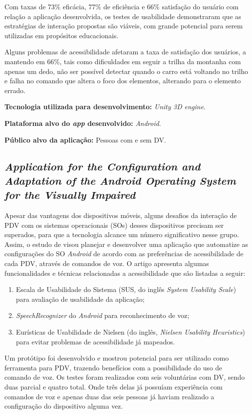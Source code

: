 Com taxas de 73\% eficácia, 77\% de eficiência e 66\% satisfação do usuário com relação a aplicação desenvolvida, os testes de usabilidade demonstraram que as estratégias de interação propostas são viáveis, com grande potencial para serem utilizadas em propósitos educacionais.

Alguns problemas de acessibilidade afetaram a taxa de satisfação dos usuários, a mantendo em 66\%, tais como dificuldades em seguir a trilha da montanha com apenas um dedo, não ser possível detectar quando o carro está voltando no trilho e falha no comando que altera o foco dos elementos, alterando para o elemento errado.

\textbf{Tecnologia utilizada para desenvolvimento:} \emph{Unity 3D engine}.

\textbf{Plataforma alvo do \emph{app} desenvolvido:} \emph{Android}.

\textbf{Público alvo da aplicação:} Pessoas com e sem DV\@.

\subsection{\emph{Application for the Configuration and Adaptation of the Android Operating System for the Visually Impaired}}

Apesar das vantagens dos dispositivos móveis, alguns desafios da interação de PDV com os sistemas operacionais (SOs) desses dispositivos precisam ser superados, para que a tecnologia alcance um número significativo nesse grupo.
Assim, o estudo de  visou planejar e desenvolver uma aplicação que automatize as configurações do SO \emph{Android} de acordo com as preferências de acessibilidade de cada PDV, através de comandos de voz.
O artigo apresenta algumas funcionalidades e técnicas relacionadas a acessibilidade que são listadas a seguir:

\begin{enumerate}
\item Escala de Usabilidade do Sistema (SUS, do inglês \emph{System Usability Scale}) para avaliação de usabilidade da aplicação;
\item \emph{SpeechRecognizer} do \emph{Android} para reconhecimento de voz;
\item Eurísticas de Usabilidade de Nielsen (do inglês, \emph{Nielsen Usability Heuristics}) para evitar problemas de acessibilidade já mapeados.
\end{enumerate}

Um protótipo foi desenvolvido e mostrou potencial para ser utilizado como ferramenta para PDV, trazendo benefícios com a possibilidade do uso de comando de voz.
Os testes foram realizados com seis voluntárias com DV, sendo duas parcial e quatro total.
Onde três delas já possuíam experiência com comandos de voz e apenas duas das seis pessoas já haviam realizado a configuração do dispositivo alguma vez.

